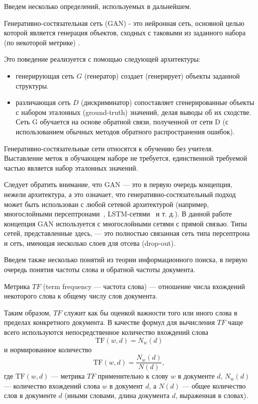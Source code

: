 Введем несколько определений, используемых в дальнейшем.
\begin{defn}
    Генеративно-состязательная сеть (GAN) - это нейронная сеть, основной целью которой является генерация объектов,
    сходных с таковыми из заданного набора (по некоторой метрике) \cite{10.5555/2969033.2969125}.
\end{defn}
Это поведение реализуется с помощью следующей архитектуры:
\begin{itemize}
    \item генерирующая сеть $G$ (генератор) создает (генерирует) объекты заданной структуры.
    \item различающая сеть $D$ (дискриминатор) сопоставляет сгенерированные объекты с набором эталонных (ground-truth) значений,
          делая выводы об их сходстве. Сеть G обучается на основе обратной связи, полученной от сети D (с использованием обычных
          методов обратного распространения ошибок).
\end{itemize}
Генеративно-состязательные сети относятся к обучению без учителя. Выставление меток в обучающем наборе не требуется,
единственной требуемой частью является набор эталонных значений.

Следует обратить внимание, что GAN --- это в первую очередь концепция, нежели архитектура, а это означает, что
генеративно-состязательный подход может быть использован с любой сетевой архитектурой (например, многослойными
персептронами~\cite{Rosenblatt1958ThePA}, LSTM-сетями~\cite{10.1162/neco.1997.9.8.1735} и т. д.). В данной работе
концепция GAN используется с многослойными сетями с прямой связью.
Типы сетей, представленные здесь, --- это полностью связанная сеть типа персептрона и сеть, имеющая несколько слоев для отсева
(drop-out).

Введем также несколько понятий из теории информационного поиска, в первую очередь понятия частоты слова и обратной частоты документа.

\begin{defn}
    Метрика $TF$ (term frequency --- частота слова) --- отношение числа вхождений некоторого слова к общему числу слов документа.
\end{defn}
Таким образом, $TF$ служит как бы оценкой важности того или иного слова в пределах конкретного документа.
В качестве формул для вычисления $TF$ чаще всего используются \cite{manning_raghavan_schuetze_2008}
непосредственное количество вхождений слова
\begin{equation}
    \label{eq:raw-tf}
    \text{TF}(w, d) = N_w(d)
\end{equation}
и нормированное количество
\begin{equation}
    \label{eq:norm-tf}
    \text{TF}(w, d) = \frac{N_w(d)}{N(d)},
\end{equation}
где $\text{TF}(w, d)$ --- метрика $TF$ применительно к слову $w$ в документе $d$, $N_w(d)$ --- количество вхождений слова $w$
в документ $d$, а $N(d)$ --- общее количество слов в документе $d$ (иными словами, длина документа $d$, выраженная в словах).

